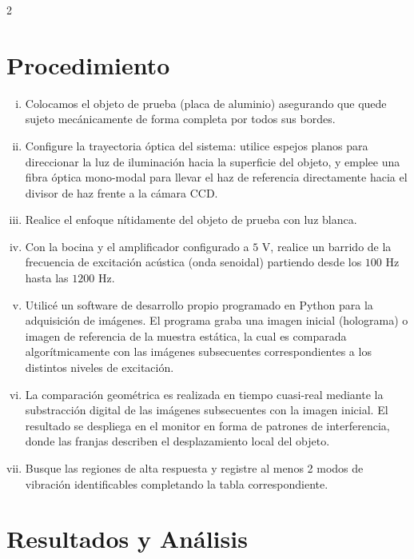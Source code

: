\documentclass[letterpaper]{article}
\begin{document}
\begin{multicols}{2}
		\section*{Procedimiento}
		
		\begin{enumerate}[i)]
			\item Colocamos el objeto de prueba (placa de aluminio) asegurando que quede sujeto mecánicamente de forma completa por todos sus bordes.
			\item Configure la trayectoria óptica del sistema: utilice espejos planos para direccionar la luz de iluminación hacia la superficie del objeto, y emplee una fibra óptica mono-modal para llevar el haz de referencia directamente hacia el divisor de haz frente a la cámara CCD.
			\item Realice el enfoque nítidamente del objeto de prueba con luz blanca.
			\item Con la bocina y el amplificador configurado a $5\text{ V}$, realice un barrido de la frecuencia de excitación acústica (onda senoidal) partiendo desde los $100\text{ Hz}$ hasta las $1200\text{ Hz}$.
			\item Utilicé un software de desarrollo propio programado en Python para la adquisición de imágenes. El programa graba una imagen inicial (holograma) o imagen de referencia de la muestra estática, la cual es comparada algorítmicamente con las imágenes subsecuentes correspondientes a los distintos niveles de excitación.
			\item La comparación geométrica es realizada en tiempo cuasi-real mediante la substracción digital de las imágenes subsecuentes con la imagen inicial. El resultado se despliega en el monitor en forma de patrones de interferencia, donde las franjas describen el desplazamiento local del objeto.
			\item Busque las regiones de alta respuesta y registre al menos 2 modos de vibración identificables completando la tabla correspondiente.
		\end{enumerate}
		
		\section*{Resultados y Análisis}
		

\end{multicols}
\end{document}
